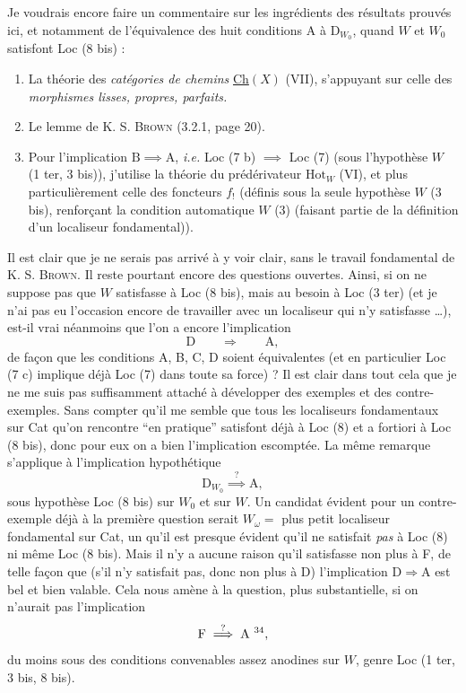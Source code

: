 Je voudrais encore faire un commentaire sur les ingrédients des résultats prouvés ici, et notamment de l'équivalence des huit conditions A à $\mathrm{D}_{W_0}$, quand $W$ et $W_0$ satisfont Loc (8 bis) :

%
\begin{enumerate}[leftmargin=2.5em]
\item[1)] La théorie des \textit{catégories de chemins} \underline{Ch}$(X)$ (VII), s'appuyant sur celle des \textit{morphismes lisses, propres, parfaits.}
\item[2)] Le lemme de K. S. \textsc{Brown} (3.2.1, page 20).
\item[3)] Pour l'implication $\mathrm{B}\implies\mathrm{A}$, \textit{i.e.} Loc (7 b) $\implies$ Loc (7) (sous l'hypothèse $W$ (1 ter, 3 bis)), j'utilise la théorie du prédérivateur $\mathrm{Hot}_W$ (VI), et plus particulièrement celle des foncteurs $f_!$ (définis sous la seule hypothèse $W$ (3 bis), renforçant la condition automatique $W$ (3) (faisant partie de la définition d'un localiseur fondamental)).
\end{enumerate}

\leavevmode{}%
Il est clair que je ne serais pas arrivé à y voir clair, sans le travail fondamental de K. S. \textsc{Brown}. Il reste pourtant encore des questions ouvertes. Ainsi, si on ne suppose pas que $W$ satisfasse à Loc (8 bis), mais au besoin à Loc (3 ter) (et je n'ai pas eu l'occasion encore de travailler avec un localiseur qui n'y satisfasse \ldots), est-il vrai néanmoins que l'on a encore l'implication
\[
\mathrm{D} \qquad \Longrightarrow \qquad \mathrm{A},
\]
de façon que les conditions A, B, C, D soient équivalentes (et en particulier Loc (7 c) implique déjà Loc (7) dans toute sa force) ? Il est clair dans tout cela que
%
je ne me suis pas suffisamment attaché à développer des exemples et des contre-exemples. Sans compter qu'il me semble que tous les localiseurs fondamentaux sur Cat qu'on rencontre “en pratique” satisfont déjà à Loc (8) et a fortiori à Loc (8 bis), donc pour eux on a bien l'implication escomptée. La même remarque s'applique à l'implication hypothétique
\[
\mathrm{D}_{W_0} \overset{?}{\implies} \mathrm{A},
\]
sous hypothèse Loc (8 bis) sur $W_0$ et sur $W$. Un candidat évident pour un contre-exemple déjà à la première question serait $W_\omega=$ plus petit localiseur fondamental sur Cat, un qu'il est presque évident qu'il ne satisfait \textit{pas} à Loc (8) ni même Loc (8 bis). Mais il n'y a aucune raison qu'il satisfasse non plus à F, de telle façon que (s'il n'y satisfait pas, donc non plus à D) l'implication $\mathrm{D}\Longrightarrow\mathrm{A}$ est bel et bien valable. Cela nous amène à la question, plus substantielle, si on n'aurait pas l'implication %
%
\[
\mathrm{F} \overset{?}{\implies} \mathrm{A}\ \text{\footnotemark[34]},
\]
%
du moins sous des conditions convenables assez anodines sur $W$, genre Loc (1 ter, 3 bis, 8 bis).

